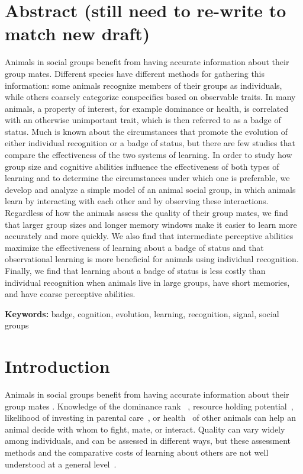 \section*{Abstract (still need to re-write to match new draft)}
Animals in social groups benefit from having accurate information about their group mates. Different species have different methods for gathering this information: some animals recognize members of their groups as individuals, while others coarsely categorize conspecifics based on observable traits. In many animals, a property of interest, for example dominance or health, is correlated with an otherwise unimportant trait, which is then referred to as a badge of status. Much is known about the circumstances that promote the evolution of either individual recognition or a badge of status, but there are few studies that compare the effectiveness of the two systems of learning. In order to study how group size and cognitive abilities influence the effectiveness of both types of learning and to determine the circumstances under which one is preferable, we develop and analyze a simple model of an animal social group, in which animals learn by interacting with each other and by observing these interactions. Regardless of how the animals assess the quality of their group mates, we find that larger group sizes and longer memory windows make it easier to learn more accurately and more quickly. We also find that intermediate perceptive abilities maximize the effectiveness of learning about a badge of status and that observational learning is more beneficial for animals using individual recognition. Finally, we find that learning about a badge of status is less costly than individual recognition when animals live in large groups, have short memories, and have coarse perceptive abilities.



\textbf{Keywords:} badge, cognition, evolution, learning, recognition, signal, social groups

\newpage
\section*{Introduction} 
Animals in social groups benefit from having accurate information about their group mates \citep{Seyfarth:2010bh}. Knowledge of the dominance rank ~\citep{Waal:1986ys,Cowlishaw:1990vn,Bergman:2003qf,Seyfarth:2005ve,Flack:2006uq,Hobson:2015uq}, resource holding potential~\citep{Rhijn:1980uq,Freeman:1985kl,Dick:1990cr,Lemel:1993ve}, likelihood of investing in parental care~\citep{Qvarnstrom:1997fk,Olsen:2010uq}, or health~\citep{Folstad:1992kx,Loyau:2005nx} of other animals can help an animal decide with whom to fight, mate, or interact. Quality can vary widely among individuals, and can be assessed in different ways, but these assessment methods and the comparative costs of learning about others are not well understood at a general level~\citep{sheehan2016evotradeoff}. 

